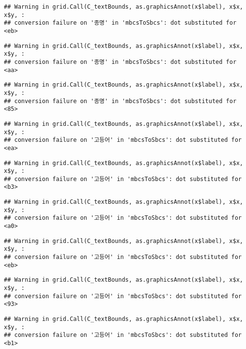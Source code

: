 \documentclass[
]{article}
\begin{document}
\begin{verbatim}
## Warning in grid.Call(C_textBounds, as.graphicsAnnot(x$label), x$x, x$y, :
## conversion failure on '종명' in 'mbcsToSbcs': dot substituted for <eb>
\end{verbatim}

\begin{verbatim}
## Warning in grid.Call(C_textBounds, as.graphicsAnnot(x$label), x$x, x$y, :
## conversion failure on '종명' in 'mbcsToSbcs': dot substituted for <aa>
\end{verbatim}

\begin{verbatim}
## Warning in grid.Call(C_textBounds, as.graphicsAnnot(x$label), x$x, x$y, :
## conversion failure on '종명' in 'mbcsToSbcs': dot substituted for <85>
\end{verbatim}

\begin{verbatim}
## Warning in grid.Call(C_textBounds, as.graphicsAnnot(x$label), x$x, x$y, :
## conversion failure on '고등어' in 'mbcsToSbcs': dot substituted for <ea>
\end{verbatim}

\begin{verbatim}
## Warning in grid.Call(C_textBounds, as.graphicsAnnot(x$label), x$x, x$y, :
## conversion failure on '고등어' in 'mbcsToSbcs': dot substituted for <b3>
\end{verbatim}

\begin{verbatim}
## Warning in grid.Call(C_textBounds, as.graphicsAnnot(x$label), x$x, x$y, :
## conversion failure on '고등어' in 'mbcsToSbcs': dot substituted for <a0>
\end{verbatim}

\begin{verbatim}
## Warning in grid.Call(C_textBounds, as.graphicsAnnot(x$label), x$x, x$y, :
## conversion failure on '고등어' in 'mbcsToSbcs': dot substituted for <eb>
\end{verbatim}

\begin{verbatim}
## Warning in grid.Call(C_textBounds, as.graphicsAnnot(x$label), x$x, x$y, :
## conversion failure on '고등어' in 'mbcsToSbcs': dot substituted for <93>
\end{verbatim}

\begin{verbatim}
## Warning in grid.Call(C_textBounds, as.graphicsAnnot(x$label), x$x, x$y, :
## conversion failure on '고등어' in 'mbcsToSbcs': dot substituted for <b1>
\end{verbatim}
\end{document}
